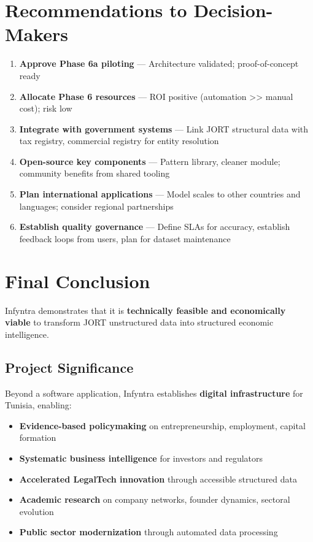 \documentclass[12pt,a4paper]{report}
\begin{document}
\section{Recommendations to Decision-Makers}

\begin{enumerate}
    \item \textbf{Approve Phase 6a piloting} — Architecture validated; proof-of-concept ready
    \item \textbf{Allocate Phase 6 resources} — ROI positive (automation >> manual cost); risk low
    \item \textbf{Integrate with government systems} — Link JORT structural data with tax registry, commercial registry for entity resolution
    \item \textbf{Open-source key components} — Pattern library, cleaner module; community benefits from shared tooling
    \item \textbf{Plan international applications} — Model scales to other countries and languages; consider regional partnerships
    \item \textbf{Establish quality governance} — Define SLAs for accuracy, establish feedback loops from users, plan for dataset maintenance
\end{enumerate}

\section{Final Conclusion}

Infyntra demonstrates that it is \textbf{technically feasible and economically viable} to transform JORT unstructured data into structured economic intelligence.

\subsection{Project Significance}

Beyond a software application, Infyntra establishes \textbf{digital infrastructure} for Tunisia, enabling:

\begin{itemize}
    \item \textbf{Evidence-based policymaking} on entrepreneurship, employment, capital formation
    \item \textbf{Systematic business intelligence} for investors and regulators
    \item \textbf{Accelerated LegalTech innovation} through accessible structured data
    \item \textbf{Academic research} on company networks, founder dynamics, sectoral evolution
    \item \textbf{Public sector modernization} through automated data processing
\end{itemize}
\end{document}
